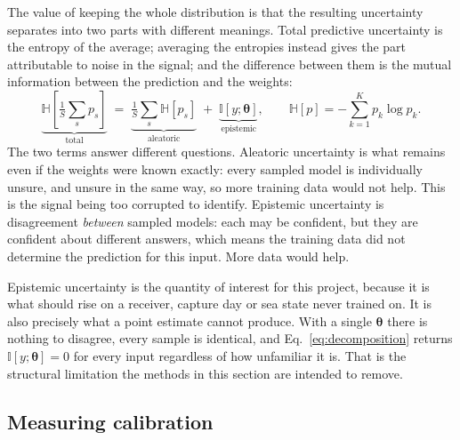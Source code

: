 \documentclass{article}
\begin{document}
The value of keeping the whole distribution is that the resulting uncertainty
separates into two parts with different meanings. Total predictive uncertainty
is the entropy of the average; averaging the entropies instead gives the part
attributable to noise in the signal; and the difference between them is the
mutual information between the prediction and the weights:
\begin{equation}
\underbrace{\mathbb{H}\!\left[\tfrac{1}{S}\textstyle\sum_s p_s\right]}_{\text{total}}
\;=\;
\underbrace{\tfrac{1}{S}\textstyle\sum_s \mathbb{H}\!\left[p_s\right]}_{\text{aleatoric}}
\;+\;
\underbrace{\mathbb{I}\!\left[y; \boldsymbol{\theta}\right]}_{\text{epistemic}},
\qquad
\mathbb{H}[p] = -\sum_{k=1}^{K} p_k \log p_k .
\label{eq:decomposition}
\end{equation}
The two terms answer different questions. Aleatoric uncertainty is what remains
even if the weights were known exactly: every sampled model is individually
unsure, and unsure in the same way, so more training data would not help. This
is the signal being too corrupted to identify. Epistemic uncertainty is
disagreement \emph{between} sampled models: each may be confident, but they are
confident about different answers, which means the training data did not
determine the prediction for this input. More data would help.

Epistemic uncertainty is the quantity of interest for this project, because it
is what should rise on a receiver, capture day or sea state never trained on.
It is also precisely what a point estimate cannot produce. With a single
$\boldsymbol{\theta}$ there is nothing to disagree, every sample is identical,
and Eq.~\eqref{eq:decomposition} returns $\mathbb{I}[y;\boldsymbol{\theta}] = 0$
for every input regardless of how unfamiliar it is. That is the structural
limitation the methods in this section are intended to remove.

\subsection{Measuring calibration}
\end{document}

